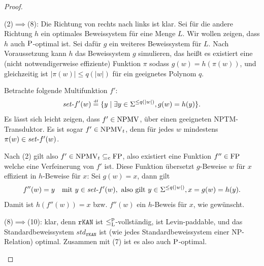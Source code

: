 \begin{proof}
\begin{prooflist}

\item (2)$\implies$(8): Die Richtung von rechts nach links ist klar. Sei für die andere Richtung $h$ ein optimales Beweissystem für eine Menge $L$. Wir wollen zeigen, dass $h$ auch $\P$-optimal ist. Sei dafür $g$ ein weiteres Beweissystem für $L$. Nach Voraussetzung kann $h$ das Beweissystem $g$ simulieren, das heißt es existiert eine (nicht notwendigerweise effiziente) Funktion $\pi$ sodass $g(w)=h(\pi(w))$, und gleichzeitig ist $|\pi(w)|\leq q(|w|)$ für ein geeignetes Polynom $q$.

Betrachte folgende Multifunktion $f'$:
\[ \fset{}f'(w) \defeq  \{ y \mid \exists y\in\Sigma^{\leq q(|w|)}, g(w)=h(y) \}. \]
Es lässt sich leicht zeigen, dass $f'\in\NPMV$, über einen geeigneten NPTM-Transduktor. 
Es ist sogar $f'\in\NPMV_t$, denn für jedes $w$ mindestens $\pi(w)\in \fset{}f'(w)$.

Nach (2) gilt also $f'\in\NPMV_t\subseteqc \FP$, also existiert eine Funktion $f''\in\FP$ welche eine Verfeinerung von $f'$ ist. Diese Funktion übersetzt $g$-Beweise $w$ für $x$ effizient in $h$-Beweise für $x$: 
Sei $g(w)=x$, dann gilt
\[ f''(w) = y \quad\text{mit } y\in\fset{}f'(w), \text{ also gilt } y\in\Sigma^{\leq q(|w|)}, x=g(w)=h(y). \]
Damit ist $h(f''(w))=x$ bzw. $f''(w)$ ein $h$-Beweis für $x$, wie gewünscht.


\item (8)$\implies$(10): klar, denn $\mathtt{rKAN}$ ist $\leqlp$-vollständig, ist Levin-paddable, und das Standardbeweissystem $\mathit{std}_\mathtt{rKAN}$ ist (wie jedes Standardbeweissystem einer NP-Relation) optimal. Zusammen mit (7) ist es also auch $\P$-optimal.
\end{prooflist}
\end{proof}

